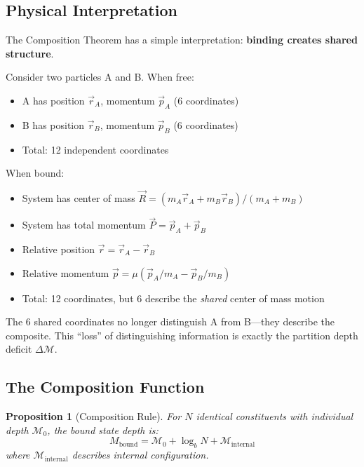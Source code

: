 \documentclass[twocolumn,10pt,a4paper]{article}
\newtheorem{proposition}[theorem]{Proposition}
\theoremstyle{definition}
\theoremstyle{remark}
\newcommand{\Depth}{\mathcal{M}}
\newcommand{\Mbound}{M_{\mathrm{bound}}}
\begin{document}
\subsection{Physical Interpretation}

The Composition Theorem has a simple interpretation: \textbf{binding creates shared structure}.

Consider two particles A and B. When free:
\begin{itemize}
    \item A has position $\vec{r}_A$, momentum $\vec{p}_A$ (6 coordinates)
    \item B has position $\vec{r}_B$, momentum $\vec{p}_B$ (6 coordinates)
    \item Total: 12 independent coordinates
\end{itemize}

When bound:
\begin{itemize}
    \item System has center of mass $\vec{R} = (m_A\vec{r}_A + m_B\vec{r}_B)/(m_A + m_B)$
    \item System has total momentum $\vec{P} = \vec{p}_A + \vec{p}_B$
    \item Relative position $\vec{r} = \vec{r}_A - \vec{r}_B$
    \item Relative momentum $\vec{p} = \mu(\vec{p}_A/m_A - \vec{p}_B/m_B)$
    \item Total: 12 coordinates, but 6 describe the \emph{shared} center of mass motion
\end{itemize}

The 6 shared coordinates no longer distinguish A from B---they describe the composite. This ``loss'' of distinguishing information is exactly the partition depth deficit $\Delta\Depth$.

\subsection{The Composition Function}

\begin{proposition}[Composition Rule]
\label{prop:composition_rule}
For $N$ identical constituents with individual depth $\Depth_0$, the bound state depth is:
\begin{equation}
    \Mbound = \Depth_0 + \log_b N + \Depth_{\text{internal}}
\end{equation}
where $\Depth_{\text{internal}}$ describes internal configuration.
\end{proposition}
\end{document}
